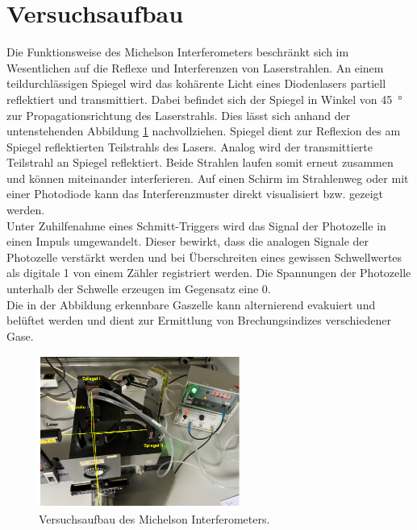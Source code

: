 %

%
\section{Versuchsaufbau}

Die Funktionsweise des Michelson Interferometers beschränkt sich  im Wesentlichen auf die Reflexe und Interferenzen 
von Laserstrahlen. An einem teildurchlässigen Spiegel wird das kohärente Licht eines Diodenlasers partiell reflektiert 
und transmittiert. Dabei befindet sich der Spiegel in Winkel von \qty{45}{\degree} zur Propagationsrichtung des Laserstrahls.
Dies lässt sich anhand der untenstehenden Abbildung \ref{fig:Aufbau} nachvollziehen. Spiegel  dient zur Reflexion des 
am Spiegel reflektierten Teilstrahls des Lasers. Analog wird der transmittierte Teilstrahl an Spiegel  reflektiert.
Beide Strahlen laufen somit erneut zusammen und können miteinander interferieren. Auf einen Schirm im Strahlenweg oder mit einer
Photodiode kann das Interferenzmuster direkt visualisiert bzw. gezeigt werden.\\

\noindent Unter Zuhilfenahme eines Schmitt-Triggers wird das Signal der Photozelle in einen Impuls umgewandelt. Dieser bewirkt,
dass die analogen Signale der Photozelle verstärkt werden und bei Überschreiten eines gewissen Schwellwertes als digitale 1 von 
einem Zähler registriert werden. Die Spannungen der Photozelle unterhalb der Schwelle erzeugen im Gegensatz eine 0.\\

\noindent Die in der Abbildung erkennbare Gaszelle kann alternierend evakuiert und belüftet werden und dient zur Ermittlung 
von Brechungsindizes verschiedener Gase.

\begin{figure}[H]
    \centering
    \includegraphics[height=5cm]{content/Aufbau.png}
    \caption{Versuchsaufbau des Michelson Interferometers\cite{Versuchsanleitung_v401}.}
    \label{fig:Aufbau}
\end{figure}

